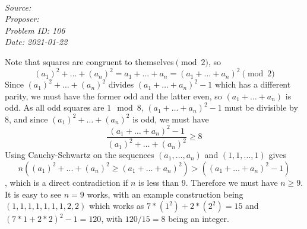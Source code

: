 \SSbreak\\
\emph{Source: \Cop}\\
\emph{Proposer: \Pchris}\\
\emph{Problem ID: 106}\\
\emph{Date: 2021-01-22}\\
\SSbreak

\bigskip

\begin{solution}\hfil\medskip

    Note that squares are congruent to themselves\(\pmod 2\), so \[(a_1)^2 + \ldots + (a_n)^2 = a_1 +\ldots + a_n = (a_1 + \ldots + a_n)^2\pmod{2}\] Since \((a_1)^2 + \ldots + (a_n)^2\) divides \((a_1 +\ldots + a_n)^2 - 1\) which has a different parity, we must have the former odd and the latter even, so \((a_1 + \ldots + a_n)\) is odd. As all odd squares are \(1\mod 8\), \((a_1 +\ldots+ a_n)^2 - 1\) must be divisible by 8, and since \((a_1)^2 + \ldots+ (a_n)^2 \) is odd, we must have 
    \begin{equation*}
    \frac{(a_1 + \ldots + a_n)^2 - 1}{(a_1)^2 + \ldots + (a_n)^2} \geq 8
\end{equation*}
    Using Cauchy-Schwartz on the sequences \((a_1, \ldots, a_n)\) and \((1, 1, ..., 1)\) gives \[n((a_1)^2 + ... + (a_n)^2 \geq (a_1 + \ldots+ a_n)^2) > ((a_1 +\ldots + a_n)^2 - 1)\], which is a direct contradiction if \(n\) is less than 9. Therefore we must have \(n \geq 9\). It is easy to see \(n = 9\) works, with an example construction being \((1, 1, 1, 1, 1, 1, 1, 2, 2)\) which works as \(7*(1^2) + 2*(2^2) = 15\) and \((7*1 + 2*2)^2 - 1 = 120\), with \(120/15 = 8\) being an integer.\\

\end{solution}\bigskip
